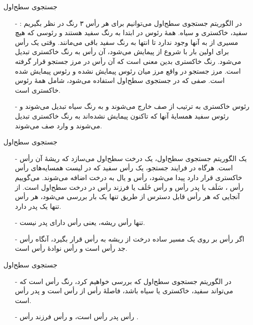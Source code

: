\begin{frame}{‌جستجوی سطح‌اول}
\begin{itemize}\itemr
\item[-]
در الگوریتم جستجوی سطح‌اول می‌توانیم برای هر رأس ۳ رنگ در نظر بگیریم : سفید، خاکستری و سیاه. همهٔ رئوس در ابتدا به رنگ سفید هستند و رئوسی که هیچ مسیری از
به آنها وجود ندارد تا انتها به رنگ سفید باقی می‌‌مانند. وقتی یک رأس برای اولین بار با شروع از
پیمایش می‌شود، آن رأس به رنگ خاکستری تبدیل می‌شود. رنگ خاکستری بدین معنی است که آن رأس در مرز جستجو قرار گرفته است. مرز جستجو در واقع مرز میان رئوس پیمایش نشده و رئوس پیمایش شده است. صفی که در جستجوی سطح‌اول استفاده می‌شود، شامل همهٔ رئوس خاکستری است.
\item[-]
رئوس خاکستری به ترتیب از صف خارج می‌شوند و به رنگ سیاه تبدیل می‌شوند و رئوس سفید همسایهٔ آنها که تاکنون پیمایش نشده‌اند به رنگ خاکستری تبدیل می‌شوند و وارد صف می‌شوند.
\end{itemize}
\end{frame}


\begin{frame}{‌جستجوی سطح‌اول}
\begin{itemize}\itemr
\item[-]
یک الگوریتم جستجوی سطح‌اول، یک درخت سطح‌اول می‌سازد که ریشهٔ آن رأس
است. هرگاه در فرایند جستجو، یک رأس سفید
که در لیست همسایه‌های رأس خاکستری
 قرار دارد پیدا می‌شود، رأس
و یال
به درخت اضافه می‌شوند. می‌گوییم رأس
، سَلَف
یا پدر رأس
و رأس
خَلَف
یا فرزند رأس
در درخت سطح‌اول است. از آنجایی که هر رأس قابل دسترس از طریق
تنها یک بار بررسی می‌شود، هر رأس تنها یک پدر دارد.
\item[-]
تنها رأس ریشه، یعنی رأس
  دارای پدر نیست.
\item[-]
اگر رأس
بر روی یک مسیر ساده درخت از ریشه
به رأس
قرار بگیرد، آنگاه رأس
جد
رأس
است و رأس
نوادهٔ
رأس
است.
\end{itemize}
\end{frame}


\begin{frame}{‌جستجوی سطح‌اول}
\begin{itemize}\itemr
\item[-]
در الگوریتم جستجوی سطح‌اول که بررسی خواهیم کرد،
رنگ رأس
است که می‌تواند سفید، خاکستری یا سیاه باشد،
فاصلهٔ رأس
از رأس
است و
پدر رأس
است.
\item[-]
 رأس
پدر
 رأس
است، و رأس
فرزند
رأس
.
\end{itemize}
\end{frame}


